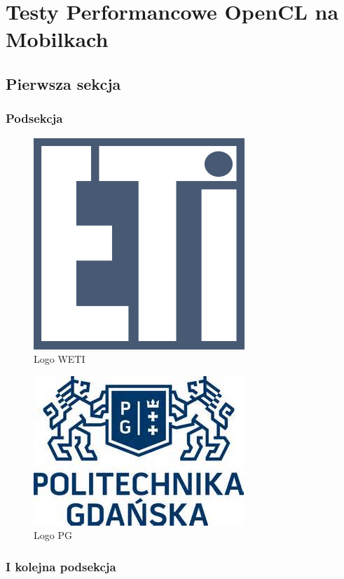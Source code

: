 \section[Testy Performancowe OpenCL na Mobilkach]{Testy Performancowe OpenCL na Mobilkach}

\subsection[Pierwsza sekcja]{Pierwsza sekcja}
\subsubsection{Podsekcja}
\lipsum[6]

\begin{figure}[H]
	\includegraphics[scale=0.8]{imgs/eti.png}
	\caption{Logo WETI}
\end{figure}

\lipsum[3]

\begin{figure}[H]
	\includegraphics[scale=0.8]{imgs/pg.jpg}
	\caption{Logo PG}
\end{figure}

\lipsum[7]

\subsubsection{I kolejna podsekcja}
\lipsum[2]

